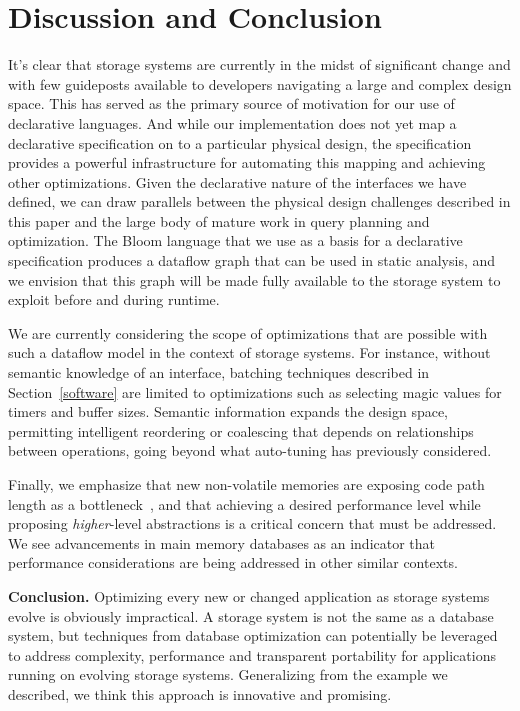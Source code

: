\section{Discussion and Conclusion}
\label{sec:opts}

It's clear that storage systems are currently in the midst of significant
change and with few guideposts available to developers navigating a
large and complex design space. This has served as the primary source
of motivation for our use of declarative languages. And while our
implementation does not yet map a declarative specification on to a particular
physical design, the specification provides a powerful infrastructure for
automating this mapping and achieving other optimizations.
Given the declarative nature of the interfaces we have defined, we can draw
parallels between the physical design challenges described in this paper and
the large body of mature work in query planning and optimization.  The Bloom
language that we use as a basis for a declarative specification
produces a dataflow graph that can be used in static analysis, and we
envision that this graph will be made fully available to the storage system to
exploit before and during runtime.

We are currently considering the scope of optimizations that are possible with
such a dataflow model in the context of storage systems. For instance, without
semantic knowledge of an interface, batching techniques described in
Section~\ref{software} are limited to optimizations such as selecting magic
values for timers and buffer sizes. Semantic information expands the design
space, permitting intelligent reordering or coalescing that depends on
relationships between operations, going beyond what auto-tuning has
previously considered.

Finally, we emphasize that new non-volatile memories are exposing code path
length as a bottleneck~\cite{bottle}, and that achieving a desired performance
level while proposing \emph{higher}-level abstractions is a critical concern
that must be addressed. We see advancements in main memory databases as an
indicator that performance considerations are being addressed in other similar
contexts.

{\bf Conclusion.} Optimizing every new or changed application as storage
systems evolve is obviously impractical.  A storage system is not the same as a
database system, but techniques from database optimization can potentially be
leveraged to address complexity, performance and transparent portability for
applications running on evolving storage systems.  Generalizing from the
example we described, we think this approach is innovative and promising. 

